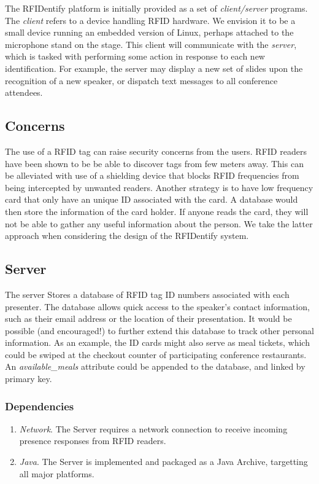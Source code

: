 \documentclass{article}
\begin{document}
	The RFIDentify platform is initially provided as a set of \textit{client/server} programs.  The \textit{client}
        refers to a device handling RFID hardware. We envision it to be a small device
        running an embedded version of Linux, perhaps attached to the microphone stand on the stage.
        This client will communicate with the \textit{server}, which is tasked with performing some 
        action in response to each new identification.  For example, the server may display a new set of 
        slides upon the recognition of a new speaker, or dispatch text messages to all conference attendees.


        \subsection{Concerns}
	The use of a RFID tag can raise security concerns from the users. 
        RFID readers have been shown to be be able to discover tags from few meters away.
	This can be alleviated with use of a shielding device that blocks RFID frequencies from being 
        intercepted by unwanted readers. 
        Another strategy is to 	have low frequency card that only have an unique ID associated with 
        the card. 
        A database would then store the information of the card holder.
	If anyone reads the card, they will not be able to gather any useful information about the person.
        We take the latter approach when considering the design of the RFIDentify system.
	 
        \subsection{Server}
	The server Stores a database of RFID tag ID numbers associated with each presenter. 
        The database allows quick access to the speaker's contact information,
        such as their email address or the location of their presentation.
        It would be possible (and encouraged!) to further extend this database to track other 
        personal information.  As an example, the ID cards might also serve as meal tickets,
        which could be swiped at the checkout counter of participating conference restaurants.
        An \textit{available_meals} attribute could be appended to the database, and linked by primary key.


        \subsubsection{Dependencies}
	\begin{enumerate}
		
		\item	\textit{Network}.
		  The Server requires a network connection to receive incoming presence responses from RFID readers.
                
                \item   \textit{Java}.
                  The Server is implemented and packaged as a Java Archive, targetting all major platforms.

	\end{enumerate}
	
\end{document}
